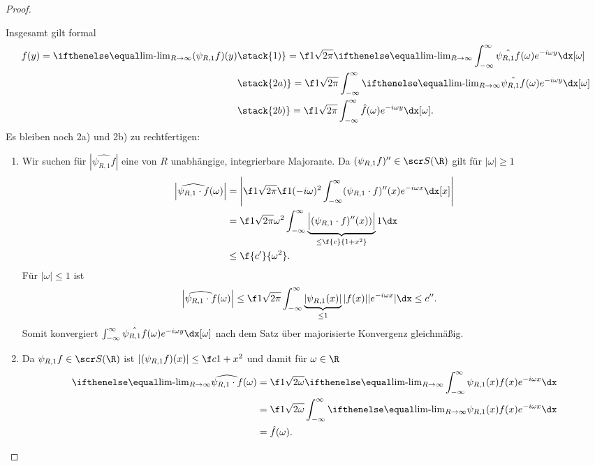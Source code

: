 \begin{st}
\begin{proof}
\begin{enumerate}[1)]
				Insgesamt gilt formal
				\begin{align*}
					f(y)
					= \lim_{R\to\infty} (\psi_{R,1} f)(y)
					&\stack{1)}= \f 1{\sqrt{2\pi}} \lim_{R\to\infty} \int_{-\infty}^\infty \hat{\psi_{R,1}f}(\omega) e^{-i\omega y} \dx[\omega] \\
					&\stack{2a)}= \f 1{\sqrt{2\pi}} \int_{-\infty}^\infty \lim_{R\to\infty} \hat{\psi_{R,1}f}(\omega) e^{-i\omega y} \dx[\omega] \\
					&\stack{2b)}= \f 1{\sqrt{2\pi}} \int_{-\infty}^\infty \hat{f}(\omega) e^{-i\omega y} \dx[\omega].
				\end{align*}
				Es bleiben noch 2a) und 2b) zu rechtfertigen:
				\begin{enumerate}[{2}a)]
					\item
						Wir suchen für $|\hat{\psi_{R,1}f}|$ eine von $R$ unabhängige, integrierbare Majorante.
						Da $(\psi_{R,1}f)'' \in \scr S(\R)$ gilt für $|\omega| \ge 1$
						\begin{align*}
							\Big|\widehat{\psi_{R,1} \cdot f}(\omega)  \Big|
							&= \Bigg| \f 1{\sqrt{2\pi}} \f 1{(-i\omega)^2} \int_{-\infty}^\infty (\psi_{R,1}\cdot f)''(x) e^{-i \omega x} \dx[x] \Bigg| \\
							&= \f 1{\sqrt{2\pi} \omega^2} \int_{-\infty}^\infty \underbrace{\Big| (\psi_{R,1} \cdot f)'' (x))\Big|}_{\le \f {c}{1+x^2}} 1 \dx \\
							&\le \f {c'}{\omega^2}.
						\end{align*}
						Für $|\omega| \le 1$ ist
						\begin{align*}
							\Big|\widehat{\psi_{R,1} \cdot f}(\omega)  \Big|
							&\le  \f 1{\sqrt{2\pi}} \int_{-\infty}^\infty \underbrace{|\psi_{R,1}(x)|}_{\le 1} |f(x)| |e^{-i\omega x}| \dx
							\le c''.
						\end{align*}
						Somit konvergiert $\int_{-\infty}^\infty \hat{\psi_{R,1}f}(\omega) e^{-i\omega y} \dx[\omega]$ nach dem Satz über majorisierte Konvergenz gleichmäßig.
					\item
						Da $\psi_{R,1}f \in \scr S(\R)$ ist $|(\psi_{R,1}f)(x)| \le \f c{1+x^2}$ und damit für $\omega \in \R$
						\begin{align*}
							\lim_{R\to \infty} \widehat{\psi_{R,1} \cdot f}(\omega)
							&= \f 1{\sqrt{2\omega}} \lim_{R\to\infty} \int_{-\infty}^\infty \psi_{R,1}(x) f(x) e^{-i \omega x} \dx \\
							&= \f 1{\sqrt{2\omega}} \int_{-\infty}^\infty \lim_{R\to\infty} \psi_{R,1}(x) f(x) e^{-i \omega x} \dx \\
							&= \hat f(\omega).
						\end{align*}
				\end{enumerate}


\end{enumerate}
\end{proof}
\end{st}
